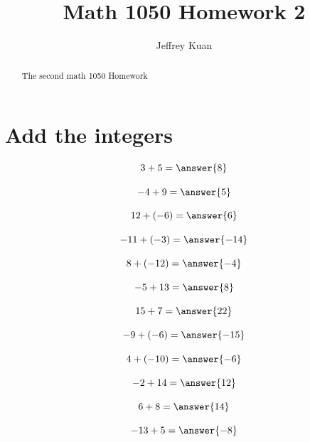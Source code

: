 \documentclass{ximera}
\author{Jeffrey Kuan}
\title{Math 1050 Homework 2}
\begin{document}
\begin{abstract}
   The second math 1050 Homework 
\end{abstract}

\maketitle
\section*{Add the integers}

\begin{problem}
\[
3 + 5 = \answer{8}
\]
\end{problem}

\begin{problem}
\[
-4 + 9 = \answer{5}
\]
\end{problem}

\begin{problem}
\[
12 + (-6) = \answer{6}
\]
\end{problem}

\begin{problem}
\[
-11 + (-3) = \answer{-14}
\]
\end{problem}

\begin{problem}
\[
8 + (-12) = \answer{-4}
\]
\end{problem}

\begin{problem}
\[
-5 + 13 = \answer{8}
\]
\end{problem}

\begin{problem}
\[
15 + 7 = \answer{22}
\]
\end{problem}

\begin{problem}
\[
-9 + (-6) = \answer{-15}
\]
\end{problem}

\begin{problem}
\[
4 + (-10) = \answer{-6}
\]
\end{problem}

\begin{problem}
\[
-2 + 14 = \answer{12}
\]
\end{problem}

\begin{problem}
\[
6 + 8 = \answer{14}
\]
\end{problem}

\begin{problem}
\[
-13 + 5 = \answer{-8}
\]
\end{problem}
\end{document}
